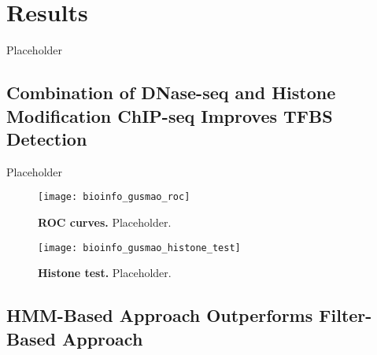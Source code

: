 \chapter{Results}
\label{cha:results}

\graphicspath{{chapter5/figs/}}

Placeholder


\section{Combination of DNase-seq and Histone Modification ChIP-seq Improves TFBS Detection}
\label{sec:dnase.histone.improves.tfbs}

Placeholder

\begin{figure}[h!]
\centering
\texttt{[image: bioinfo\_gusmao\_roc]}
\caption[ROC curves]{\textbf{ROC curves.} Placeholder.}
\label{fig:bioinfo_gusmao_roc}
\end{figure}

\begin{figure}[h!]
\centering
\texttt{[image: bioinfo\_gusmao\_histone\_test]}
\caption[Histone test]{\textbf{Histone test.} Placeholder.}
\label{fig:bioinfo_gusmao_histone_test}
\end{figure}

\section{HMM-Based Approach Outperforms Filter-Based Approach}
\label{sec:filter.results}

